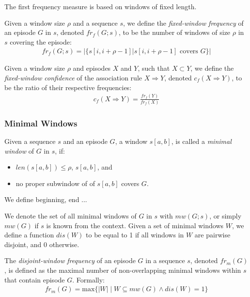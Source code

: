 The first frequency measure is based on windows of fixed length.

\begin{definition}
Given a window size $ \rho $ and a sequence $ s $, we define the \emph{fixed-window frequency} of an episode $ G $ in $ s $, denoted $ fr_f(G; s) $, to be the number of windows of size $ \rho $ in $ s $ covering the episode:
\begin{align*}
fr_f(G; s) = | \{ s[i, i + \rho - 1] | s[i, i + \rho - 1] \text{ covers } G \} |
\end{align*}
\end{definition}

\begin{definition}
Given a window size $ \rho $ and episodes $ X $ and $ Y $, such that $ X \subset Y $, we define the \emph{fixed-window confidence} of the association rule $ X \Rightarrow Y $, denoted $ c_f(X \Rightarrow Y) $, to be the ratio of their respective frequencies:
\begin{align*}
c_f(X \Rightarrow Y) = \frac{ fr_f(Y) }{ fr_f(X) }
\end{align*}
\end{definition}

\subsubsection{Minimal Windows}

\begin{definition}
Given a sequence $ s $ and an episode $ G $, a window $ s[a, b] $, is called a \emph{minimal window} of $ G $ in $ s $, if:
\begin{itemize}
\item $ len(s[a, b]) \leq \rho $, $ s[a, b] $, and
\item no proper subwindow of of $ s[a, b] $ covers $ G $.
\end{itemize}
We define beginning, end ... %

We denote the set of all minimal windows of $ G $ in $ s $ with $ mw(G; s) $, or simply $ mw(G) $ if $ s $ is known from the context. Given a set of minimal windows $ W $, we define a function $ dis(W) $ to be equal to 1 if all windows in $ W $ are pairwise disjoint, and 0 otherwise.
\end{definition}

\begin{definition}
The \emph{disjoint-window frequency} of an episode $ G $ in a sequence $ s $, denoted $ fr_m(G) $, is defined as the maximal number of non-overlapping minimal windows within $ s $ that contain episode $ G $. Formally:
\begin{align*}
fr_m(G) = \text{max} \{ | W | \mid W \subseteq mw(G) \wedge dis(W) = 1 \}
\end{align*}
\end{definition}

